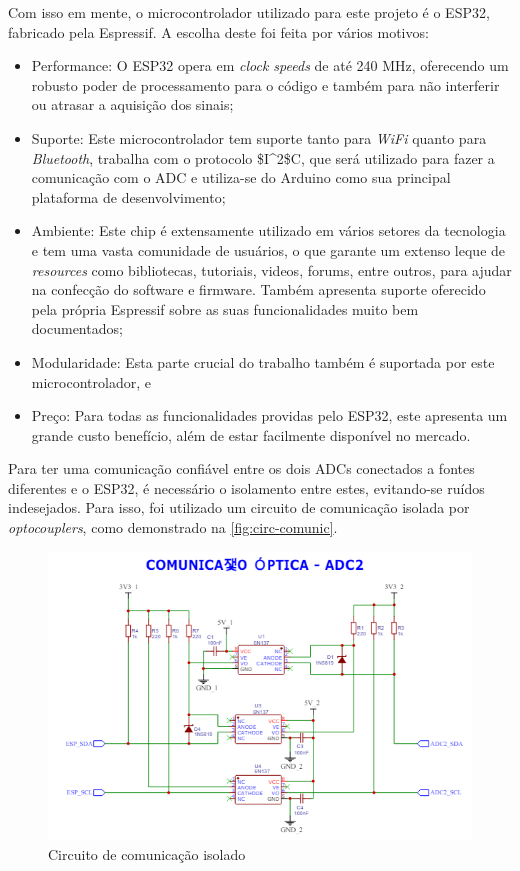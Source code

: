 Com isso em mente, o microcontrolador utilizado para este projeto é o ESP32, fabricado pela Espressif. A escolha deste foi feita por vários motivos:

\begin{itemize}
    \item Performance: O ESP32 opera em \textit{clock speeds} de até 240 MHz, oferecendo um robusto poder de processamento para o código e também para não interferir ou atrasar a aquisição dos sinais;
    \item Suporte: Este microcontrolador tem suporte tanto para \textit{WiFi} quanto para \textit{Bluetooth}, trabalha com o protocolo \gls{$I^2$C}, que será utilizado para fazer a comunicação com o \gls{ADC} e utiliza-se do Arduino como sua principal plataforma de desenvolvimento;
    \item Ambiente: Este chip é extensamente utilizado em vários setores da tecnologia e tem uma vasta comunidade de usuários, o que garante um extenso leque de \textit{resources} como bibliotecas, tutoriais, videos, forums, entre outros, para ajudar na confecção do software e firmware. Também apresenta suporte oferecido pela própria Espressif sobre as suas funcionalidades muito bem documentados;
    \item Modularidade: Esta parte crucial do trabalho também é suportada por este microcontrolador, e
    \item Preço: Para todas as funcionalidades providas pelo ESP32, este apresenta um grande custo benefício, além de estar facilmente disponível no mercado.
\end{itemize}

Para ter uma comunicação confiável entre os dois \gls{ADC}s conectados a fontes diferentes e o ESP32, é necessário o isolamento entre estes, evitando-se ruídos indesejados. Para isso, foi utilizado um circuito de comunicação isolada por \textit{optocouplers}, como demonstrado na \autoref{fig:circ-comunic}.

\begin{figure}[htb!]
    \caption{Circuito de comunicação isolado}
    \label{fig:circ-comunic}
    \includegraphics[width=1.0\textwidth]{figuras/circ-comunic.png}
    \fonte{}
\end{figure}

